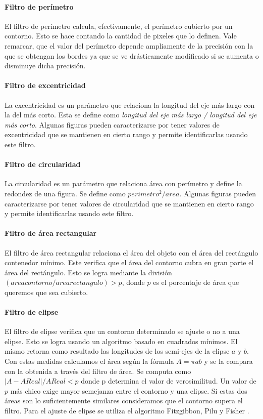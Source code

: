 	\paragraph{Filtro de per\'imetro}
	El filtro de per\'imetro calcula, efectivamente, el per\'imetro 
	cubierto por un contorno. Esto se hace contando la cantidad de pixeles que lo definen.
	Vale remarcar, que el valor del per\'imetro depende ampliamente de la precisi\'on con la que se obtengan los bordes ya que se ve dr\'asticamente modificado 
	si se aumenta o disminuye dicha precisi\'on.
	\paragraph{Filtro de excentricidad}
	La excentricidad es un par\'ametro que relaciona la longitud del eje 
	m\'as largo con la del m\'as corto. Esta se define como 
	\textit { longitud del eje m\'as largo / longitud del eje m\'as corto}. Algunas figuras pueden caracterizarse por tener valores de excentricidad
	que se mantienen en cierto rango y permite identificarlas usando este filtro.
	\paragraph{Filtro de circularidad}
	La circularidad es un par\'ametro que relaciona \'area con per\'imetro y define la redondez de una figura. Se define como $perimetro^2/area$. Algunas figuras pueden 
	caracterizarse por tener valores de circularidad que se mantienen en cierto rango y permite identificarlas usando este filtro.
	\paragraph{Filtro de \'area rectangular}
	El filtro de \'area rectangular relaciona el \'area del objeto con el \'area del rect\'angulo contenedor m\'inimo. Este verifica que el \'area
	del contorno cubra en gran parte el \'area del rect\'angulo. Esto se logra mediante la divisi\'on \newline $(area contorno / area rectangulo) > p$, donde 
	$p$ es el porcentaje de \'area que queremos que sea cubierto.
	\paragraph{Filtro de elipse}
	El filtro de elipse verifica que un contorno determinado se ajuste o no a una elipse. Esto se logra usando un algoritmo basado 
	en cuadrados m\'inimos. El mismo retorna como resultado las longitudes de los semi-ejes de la elipse $a$ y $b$. Con estas medidas calculamos
	el \'area seg\'un la f\'ormula $A=\pi a  b$ y se la compara con la 
	obtenida a trav\'es del filtro de \'area. Se computa como $|A-AReal|/ 
	AReal < p$ donde p determina el
	valor de verosimilitud. Un valor de $p$ m\'as chico exige mayor 
	semejanza entre el contorno y una elipse. Si estas dos \'areas son lo suficientemente similares consideramos que el contorno supera el filtro. 
	Para el ajuste de elipse se utiliza el algoritmo Fitzgibbon, Pilu y Fisher \cite{Fitzgibbon99}.
